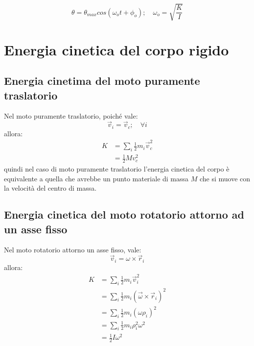 \documentclass[11pt, a4paper, openright]{book}
\theoremstyle{plain}
\theoremstyle{definition}
\begin{document}
\begin{equation}
    \theta = \theta_{max} cos(\omega_o t + \phi_o); \quad \omega_o = \sqrt{\frac{K}{I}}
\end{equation}

\newpage

\section{Energia cinetica del corpo rigido}
\subsection{Energia cinetima del moto puramente traslatorio}
Nel moto puramente traslatorio, poiché vale:
\begin{equation}
    \vec{v}_i = \vec{v}_c; \quad \forall i
\end{equation}
allora:
\begin{align}
    K & = \sum_i \frac{1}{2}m_i\vec{v}_c^2 \\
    & = \frac{1}{2}Mv_c^2
\end{align}
quindi nel caso di moto puramente traslatorio l'energia cinetica del corpo è equivalente a quella che avrebbe un punto materiale di massa $M$ che si muove con la velocità del centro di massa.

\subsection{Energia cinetica del moto rotatorio attorno ad un asse fisso}
Nel moto rotatorio attorno un asse fisso, vale:
\begin{equation}
    \vec{v}_i = \omega \times \vec{r}_i
\end{equation}
allora:
\begin{align}
    K & = \sum_i \frac{1}{2}m_i\vec{v}_i^2 \\
      & = \sum_i \frac{1}{2}m_i(\vec{\omega} \times \vec{r}_i)^2 \\
      & = \sum_i \frac{1}{2}m_i(\omega \rho_i)^2 \\
      & = \sum_i \frac{1}{2}m_i \rho_i^2 \omega^2 \\
      & = \frac{1}{2} I \omega^2
\end{align}
\end{document}
